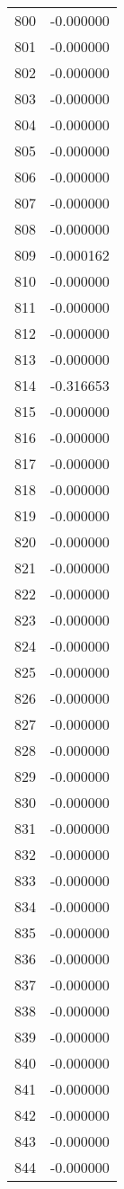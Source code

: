 \documentclass[12pt]{article}
\begin{document}
\begin{longtable}{@{}cc@{}}
800 & -0.000000 \\
801 & -0.000000 \\
802 & -0.000000 \\
803 & -0.000000 \\
804 & -0.000000 \\
805 & -0.000000 \\
806 & -0.000000 \\
807 & -0.000000 \\
808 & -0.000000 \\
809 & -0.000162 \\
810 & -0.000000 \\
811 & -0.000000 \\
812 & -0.000000 \\
813 & -0.000000 \\
814 & -0.316653 \\
815 & -0.000000 \\
816 & -0.000000 \\
817 & -0.000000 \\
818 & -0.000000 \\
819 & -0.000000 \\
820 & -0.000000 \\
821 & -0.000000 \\
822 & -0.000000 \\
823 & -0.000000 \\
824 & -0.000000 \\
825 & -0.000000 \\
826 & -0.000000 \\
827 & -0.000000 \\
828 & -0.000000 \\
829 & -0.000000 \\
830 & -0.000000 \\
831 & -0.000000 \\
832 & -0.000000 \\
833 & -0.000000 \\
834 & -0.000000 \\
835 & -0.000000 \\
836 & -0.000000 \\
837 & -0.000000 \\
838 & -0.000000 \\
839 & -0.000000 \\
840 & -0.000000 \\
841 & -0.000000 \\
842 & -0.000000 \\
843 & -0.000000 \\
844 & -0.000000 \\

\end{longtable}
\end{document}
